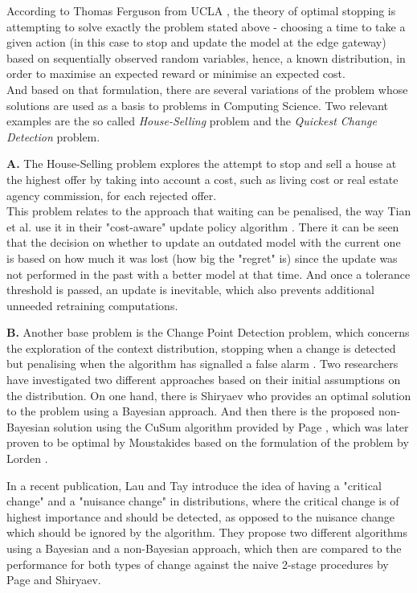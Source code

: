 \documentclass{mpaper}
\begin{document}
According to Thomas Ferguson from UCLA \cite{UCLAbook}, the theory of optimal stopping is attempting to solve exactly the problem stated above - choosing a time to take a given action (in this case to stop and update the model at the edge gateway) based on sequentially observed random variables, hence, a known distribution, in order to maximise an expected reward or minimise an expected cost. \\
And based on that formulation, there are several variations of the problem whose solutions are used as a basis to problems in Computing Science. Two relevant examples are the so called \emph{House-Selling} problem and the \emph{Quickest Change Detection} problem. 

\textbf{A.} The House-Selling problem explores the attempt to stop and sell a house at the highest offer by taking into account a cost, such as living cost or real estate agency commission, for each rejected offer.\\
This problem relates to the approach that waiting can be penalised, the way Tian et al. use it in their "cost-aware" update policy algorithm \cite{tian18}. There it can be seen that the decision on whether to update an outdated model with the current one is based on how much it was lost (how big the "regret" is) since the update was not performed in the past with a better model at that time. And once a tolerance threshold is passed, an update is inevitable, which also prevents additional unneeded retraining computations. 

\textbf{B.} Another base problem is the Change Point Detection problem, which concerns the exploration of the context distribution, stopping when a change is detected but penalising when the algorithm has signalled a false alarm \cite{UCLAbook}. 
Two researchers have investigated two different approaches based on their initial assumptions on the distribution. 
On one hand, there is Shiryaev \cite{shiryaev1963} who provides an optimal solution to the problem using a Bayesian approach. 
And then there is the proposed non-Bayesian solution using the CuSum algorithm provided by Page \cite{page1954}, which was later proven to be optimal by Moustakides \cite{moustakides1986} based on the formulation of the problem by Lorden \cite{lorden1971}.

In a recent publication, Lau and Tay\cite{lautay2018} introduce the idea of having a "critical change" and a "nuisance change" in distributions, where the critical change is of highest importance and should be detected, as opposed to the nuisance change which should be ignored by the algorithm. They propose two different algorithms using a Bayesian and a non-Bayesian approach, which then are compared to the performance for both types of change against the naive 2-stage procedures by Page\cite{page1954} and Shiryaev\cite{shiryaev1963}.
\end{document}

